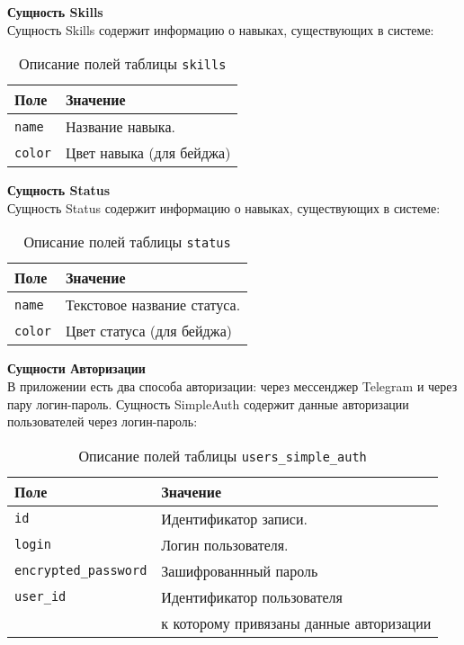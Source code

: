\noindent\textbf{Сущность Skills}\\
Сущность Skills содержит информацию о навыках, существующих в системе:
\begin{table}[!ht]
    \caption{Описание полей таблицы \texttt{skills}}
    \label{tbl:skills}
    \begin{center}
        \begin{tabular}{|p{}p{}|}
            \hline
            \textbf{Поле} & \textbf{Значение} \\\hline
            \texttt{name} & Название навыка. \\\hline
            \texttt{color} & Цвет навыка (для бейджа) \\\hline
        \end{tabular}
    \end{center}
\end{table}

\newpage
\noindent\textbf{Сущность Status}\\
Сущность Status содержит информацию о навыках, существующих в системе:
\begin{table}[!ht]
    \caption{Описание полей таблицы \texttt{status}}
    \label{tbl:status}
    \begin{center}
        \begin{tabular}{|p{}p{}|}
            \hline
            \textbf{Поле} & \textbf{Значение} \\\hline
            \texttt{name} & Текстовое название статуса. \\\hline
            \texttt{color} & Цвет статуса (для бейджа) \\\hline
        \end{tabular}
    \end{center}
\end{table}

\noindent\textbf{Сущности Авторизации}\\
В приложении есть два способа авторизации: через мессенджер Telegram\cite{telegram} и через пару логин-пароль.  
Сущность SimpleAuth содержит данные авторизации пользователей через логин-пароль:
\begin{table}[!ht]
    \caption{Описание полей таблицы \texttt{users\_simple\_auth}}
    \label{tbl:users_simple_auth}
    \begin{center}
        \begin{tabular}{|p{}p{}|}
            \hline
            \textbf{Поле} & \textbf{Значение} \\\hline
            \texttt{id} & Идентификатор записи. \\\hline
            \texttt{login} & Логин пользователя. \\\hline
            \texttt{encrypted\_password} & Зашифрованнный пароль \\\hline
            \texttt{user\_id} & Идентификатор пользователя \\ & к которому привязаны данные авторизации \\\hline
        \end{tabular}
    \end{center}
\end{table}

